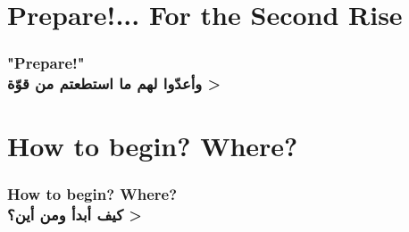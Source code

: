 \documentclass[9pt]{beamer}
\begin{document}
	\section{Prepare!... For the Second Rise}
	\begin{frame}
		\frametitle{
			"Prepare!"\\
			\<
			وأعدّوا لهم ما استطعتم من قوّة
			>
		}
	\end{frame}
	
	\section{How to begin? Where?}
	\begin{frame}
		\frametitle{
			How to begin? Where?\\
			\<
			كيف أبدأ ومن أين؟
			>
		}
	\end{frame}
	
\end{document}
